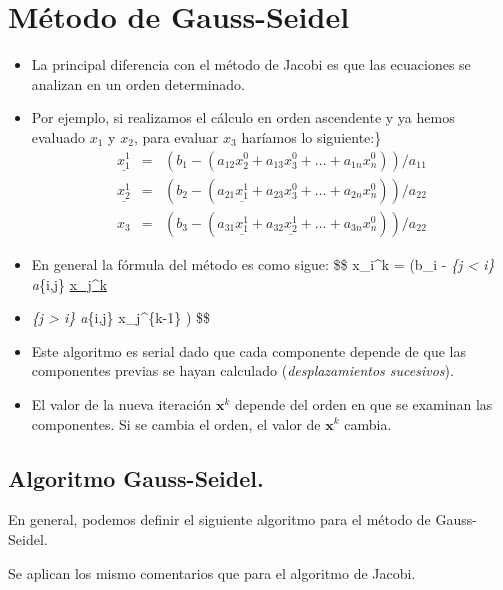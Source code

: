 \documentclass[
  letterpaper,
  DIV=11,
  numbers=noendperiod]{scrreprt}
\begin{document}

\chapter{Método de Gauss-Seidel}\label{muxe9todo-de-gauss-seidel}

\begin{itemize}
\item
  La principal diferencia con el método de Jacobi es que las ecuaciones
  se analizan en un orden determinado.
\item
  Por ejemplo, si realizamos el cálculo en orden ascendente y ya hemos
  evaluado \(x_1\) y \(x_2\), para evaluar \(x_3\) haríamos lo
  siguiente:\} \[
  \begin{eqnarray*}
  \underline{x_1^1} & = &\left( b_1 - (a_{12}x_2^0 + a_{13} x_3^0 + \dots  + a_{1n}x_n^0) \right) / a_{11}  \\
  \underline{x_2^1} & = &\left( b_2 - (a_{21}\underline{x_1^1} + a_{23}x_3^0 + \dots  + a_{2n}x_n^0) \right) / a_{22} \\
  x_3 & = &\left( b_3 - (a_{31}\underline{x_1^1} + a_{32}\underline{x_2^1} + \dots  + a_{3n}x_n^0)\right) / a_{22}
  \end{eqnarray*}
  \]
\item
  En general la fórmula del método es como sigue: \$\$ x\_i\^{}k =
   \left(b\_i - \sum\emph{\{j \textless{} i\} a}\{i,j\}
  \underline{x_j^{k}}
\item
  \sum\emph{\{j \textgreater{} i\} a}\{i,j\} x\_j\^{}\{k-1\} \right)
  \$\$
\item
  Este algoritmo es serial dado que cada componente depende de que las
  componentes previas se hayan calculado (\emph{desplazamientos
  sucesivos}).
\item
  El valor de la nueva iteración \(\mathbf{x}^k\) depende del orden en
  que se examinan las componentes. Si se cambia el orden, el valor de
  \(\mathbf{x}^k\) cambia.
\end{itemize}

\section{Algoritmo Gauss-Seidel.}\label{algoritmo-gauss-seidel.}

En general, podemos definir el siguiente algoritmo para el método de
Gauss-Seidel.

Se aplican los mismo comentarios que para el algoritmo de Jacobi.
\end{document}
